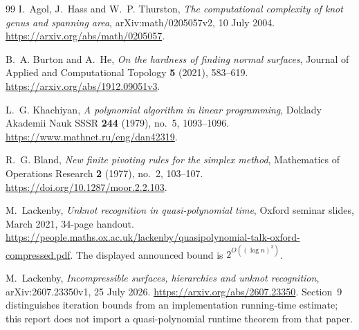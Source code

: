 \begin{thebibliography}{99}
I.~Agol, J.~Hass and W.~P. Thurston,
\emph{The computational complexity of knot genus and spanning area},
arXiv:math/0205057v2, 10 July 2004.
\url{https://arxiv.org/abs/math/0205057}.

B.~A. Burton and A.~He,
\emph{On the hardness of finding normal surfaces},
Journal of Applied and Computational Topology \textbf{5} (2021), 583--619.
\url{https://arxiv.org/abs/1912.09051v3}.

L.~G. Khachiyan,
\emph{A polynomial algorithm in linear programming},
Doklady Akademii Nauk SSSR \textbf{244} (1979), no.~5, 1093--1096.
\url{https://www.mathnet.ru/eng/dan42319}.

R.~G. Bland,
\emph{New finite pivoting rules for the simplex method},
Mathematics of Operations Research \textbf{2} (1977), no.~2, 103--107.
\url{https://doi.org/10.1287/moor.2.2.103}.

M.~Lackenby,
\emph{Unknot recognition in quasi-polynomial time},
Oxford seminar slides, March 2021, 34-page handout.
\url{https://people.maths.ox.ac.uk/lackenby/quasipolynomial-talk-oxford-compressed.pdf}.
The displayed announced bound is $2^{O((\log n)^3)}$.

M.~Lackenby,
\emph{Incompressible surfaces, hierarchies and unknot recognition},
arXiv:2607.23350v1, 25 July 2026.
\url{https://arxiv.org/abs/2607.23350}.
Section~9 distinguishes iteration bounds from an implementation running-time estimate; this report does not import a quasi-polynomial runtime theorem from that paper.

\end{thebibliography}

